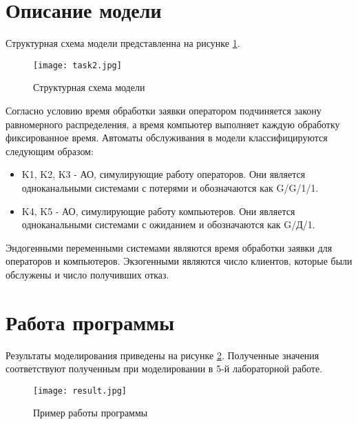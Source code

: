 \section{Описание модели}
	Структурная схема модели представленна на рисунке \ref{pic:scheme}.
	
	\begin{figure}[h]
		\begin{center}
			{\texttt{[image: task2.jpg]}
				\caption{Структурная схема модели}
				\label{pic:scheme}}
		\end{center}
	\end{figure}

	Согласно условию время обработки заявки оператором подчиняется закону равномерного распределения, а время компьютер выполняет каждую обработку фиксированное время. Автоматы обслуживания в модели классифицируются следующим образом:
	\begin{itemize}
		\item K1, K2, K3 - АО, симулирующие работу операторов. Они является одноканальными системами с потерями и обозначаются как G/G/1/1.
		\item K4, K5 - АО, симулирующие работу компьютеров. Они является одноканальными системами с ожиданием и обозначаются как G/Д/1.
	\end{itemize}

	Эндогенными переменными системами являются время обработки заявки для операторов и компьютеров. Экзогенными являются число клиентов, которые были обслужены и число получивших отказ.

	
\section{Работа программы}	
	Результаты моделирования приведены на рисунке \ref{pic:res}. Полученные значения соответствуют полученным при моделировании в 5-й лабораторной работе.
	
	\begin{figure}[h]
		\begin{center}
			{\texttt{[image: result.jpg]}
				\caption{Пример работы программы}
				\label{pic:res}}
		\end{center}
	\end{figure}
	
